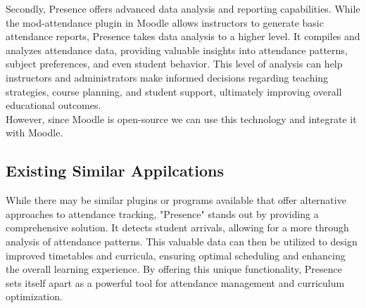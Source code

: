 Secondly, Presence offers advanced data analysis and reporting capabilities. While the mod-attendance plugin in Moodle allows instructors to generate basic attendance reports, Presence takes data analysis to a higher level. It compiles and analyzes attendance data, providing valuable insights into attendance patterns, subject preferences, and even student behavior. This level of analysis can help instructors and administrators make informed decisions regarding teaching strategies, course planning, and student support, ultimately improving overall educational outcomes.\\

However, since Moodle is open-source we can use this technology and integrate it with Moodle.


\subsection{Existing Similar Appilcations}
While there may be similar plugins or programs available that offer alternative approaches to attendance tracking, "Presence" stands out by providing a comprehensive solution. It detects student arrivals, allowing for a more through analysis of attendance patterns. This valuable data can then be utilized to design improved timetables and curricula, ensuring optimal scheduling and enhancing the overall learning experience. By offering this unique functionality, Presence sets itself apart as a powerful tool for attendance management and curriculum optimization.


